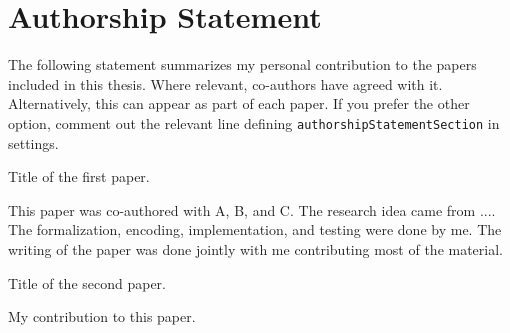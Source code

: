 
\chapter*{Authorship Statement}
\label{chap:authorshipstatement}

The following statement summarizes my personal contribution to the papers
included in this thesis. Where relevant, co-authors have agreed with it. 
Alternatively, this can appear as part of each paper. If you prefer the other option, 
comment out the relevant line defining \texttt{authorshipStatementSection} in settings. 

\begin{enumerate}[align=left,label={[\textbf{Paper \Roman*}]}]

    \item 
    Title of the first paper.
    
    This paper was co-authored with A, B, and C.
    The research idea came from .... 
    The formalization, encoding, implementation, and testing were done by me.
    The writing of the paper was done jointly with me contributing most of the material. 
    \item
    Title of the second paper.
        
     My contribution to this paper. 
\end{enumerate}

